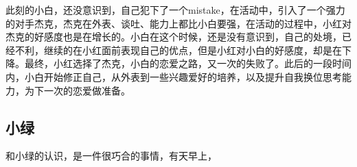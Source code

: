 \documentclass{article}
\begin{document}
此刻的小白，还没意识到，自己犯下了一个mistake，在活动中，引入了一个强力的对手杰克，杰克在外表、谈吐、能力上都比小白要强，在活动的过程中，小红对杰克的好感度也是在增长的。小白在这个时候，还是没有意识到，自己的处境，已经不利，继续的在小红面前表现自己的优点，但是小红对小白的好感度，却是在下降。最终，小红选择了杰克，小白的恋爱之路，又一次的失败了。此后的一段时间内，小白开始修正自己，从外表到一些兴趣爱好的培养，以及提升自我换位思考能力，为下一次的恋爱做准备。

\subsection{小绿}

和小绿的认识，是一件很巧合的事情，有天早上，
\end{document}
